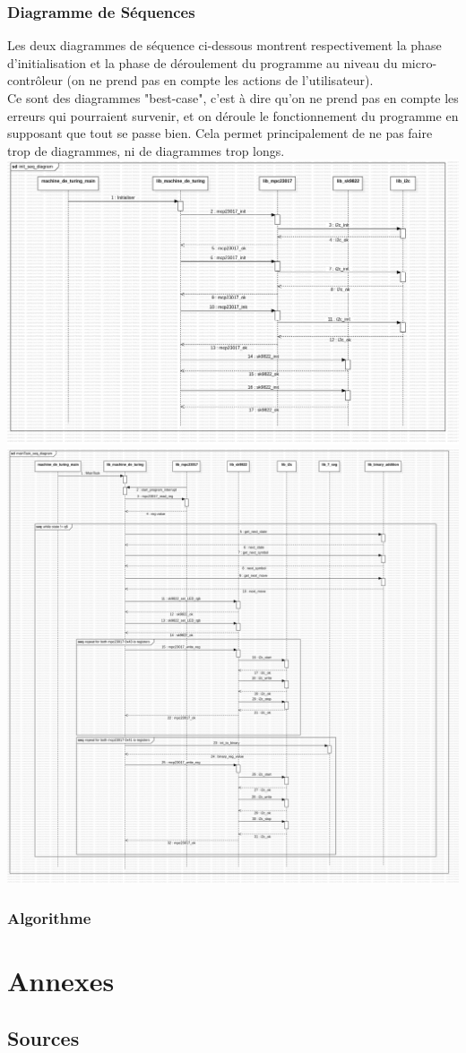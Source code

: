 \documentclass[12pt]{article}
\begin{document}
	\subsubsection{Diagramme de Séquences}
	Les deux diagrammes de séquence ci-dessous montrent respectivement la phase d'initialisation et la phase de déroulement du programme au niveau du micro-contrôleur (on ne prend pas en compte les actions de l'utilisateur).\\
	Ce sont des diagrammes "best-case", c'est à dire qu'on ne prend pas en compte les erreurs qui pourraient survenir, et on déroule le fonctionnement du programme en supposant que tout se passe bien. Cela permet principalement de ne pas faire trop de diagrammes, ni de diagrammes trop longs.\\
	\includegraphics[width=\textwidth]{img/initSeq}
	\includegraphics[width=\textwidth]{img/mainTaskSeq}
	\subsubsection{Algorithme}
	\section{Annexes}
	\subsection{Sources}
\end{document}
